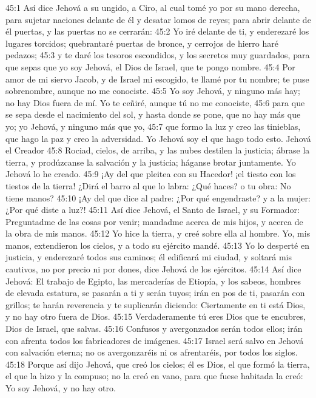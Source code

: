 45:1 Así dice Jehová a su ungido, a Ciro, al cual tomé yo por su mano derecha, para sujetar naciones delante de él y desatar lomos de reyes; para abrir delante de él puertas, y las puertas no se cerrarán:  
45:2 Yo iré delante de ti, y enderezaré los lugares torcidos; quebrantaré puertas de bronce, y cerrojos de hierro haré pedazos;  
45:3 y te daré los tesoros escondidos, y los secretos muy guardados, para que sepas que yo soy Jehová, el Dios de Israel, que te pongo nombre.  
45:4 Por amor de mi siervo Jacob, y de Israel mi escogido, te llamé por tu nombre; te puse sobrenombre, aunque no me conociste.  
45:5 Yo soy Jehová, y ninguno más hay; no hay Dios fuera de mí. Yo te ceñiré, aunque tú no me conociste,  
45:6 para que se sepa desde el nacimiento del sol, y hasta donde se pone, que no hay más que yo; yo Jehová, y ninguno más que yo,  
45:7 que formo la luz y creo las tinieblas, que hago la paz y creo la adversidad. Yo Jehová soy el que hago todo esto.  
Jehová el Creador  
45:8 Rociad, cielos, de arriba, y las nubes destilen la justicia; ábrase la tierra, y prodúzcanse la salvación y la justicia; háganse brotar juntamente. Yo Jehová lo he creado.  
45:9 ¡Ay del que pleitea con su Hacedor! ¡el tiesto con los tiestos de la tierra! ¿Dirá el barro al que lo labra: ¿Qué haces? o tu obra: No tiene manos?  
45:10 ¡Ay del que dice al padre: ¿Por qué engendraste? y a la mujer: ¿Por qué diste a luz?!  
45:11 Así dice Jehová, el Santo de Israel, y su Formador: Preguntadme de las cosas por venir; mandadme acerca de mis hijos, y acerca de la obra de mis manos.  
45:12 Yo hice la tierra, y creé sobre ella al hombre. Yo, mis manos, extendieron los cielos, y a todo su ejército mandé.  
45:13 Yo lo desperté en justicia, y enderezaré todos sus caminos; él edificará mi ciudad, y soltará mis cautivos, no por precio ni por dones, dice Jehová de los ejércitos.  
45:14 Así dice Jehová: El trabajo de Egipto, las mercaderías de Etiopía, y los sabeos, hombres de elevada estatura, se pasarán a ti y serán tuyos; irán en pos de ti, pasarán con grillos; te harán reverencia y te suplicarán diciendo: Ciertamente en ti está Dios, y no hay otro fuera de Dios.  
45:15 Verdaderamente tú eres Dios que te encubres, Dios de Israel, que salvas.  
45:16 Confusos y avergonzados serán todos ellos; irán con afrenta todos los fabricadores de imágenes.  
45:17 Israel será salvo en Jehová con salvación eterna; no os avergonzaréis ni os afrentaréis, por todos los siglos.  
45:18 Porque así dijo Jehová, que creó los cielos; él es Dios, el que formó la tierra, el que la hizo y la compuso; no la creó en vano, para que fuese habitada la creó: Yo soy Jehová, y no hay otro.  
